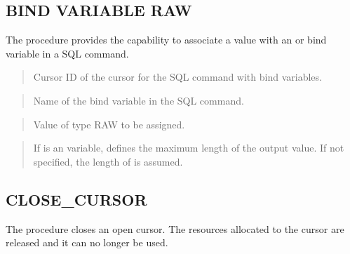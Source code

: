 \documentclass[letterpaper,10pt,english,openany,oneside]{sphinxmanual}
\begin{document}
\subsection{BIND VARIABLE RAW}
\label{\detokenize{bind_variable_raw::doc}}\label{\detokenize{bind_variable_raw:bind-variable-raw}}
The  procedure provides the capability to associate a
 value with an  or  bind variable in a SQL command.
\begin{quote}

\begin{quote}

\end{quote}
\end{quote}


\begin{quote}

Cursor ID of the cursor for the SQL command with bind variables.
\end{quote}

\begin{quote}

Name of the bind variable in the SQL command.
\end{quote}

\begin{quote}

Value of type RAW to be assigned.
\end{quote}

\begin{quote}

If  is an  variable, defines the maximum length of the
output value. If not specified, the length of  is assumed.
\end{quote}

\newpage


\subsection{CLOSE\_CURSOR}
\label{\detokenize{close_cursor::doc}}\label{\detokenize{close_cursor:close-cursor}}
The  procedure closes an open cursor. The resources
allocated to the cursor are released and it can no longer be used.
\begin{quote}

\end{quote}
\end{document}
